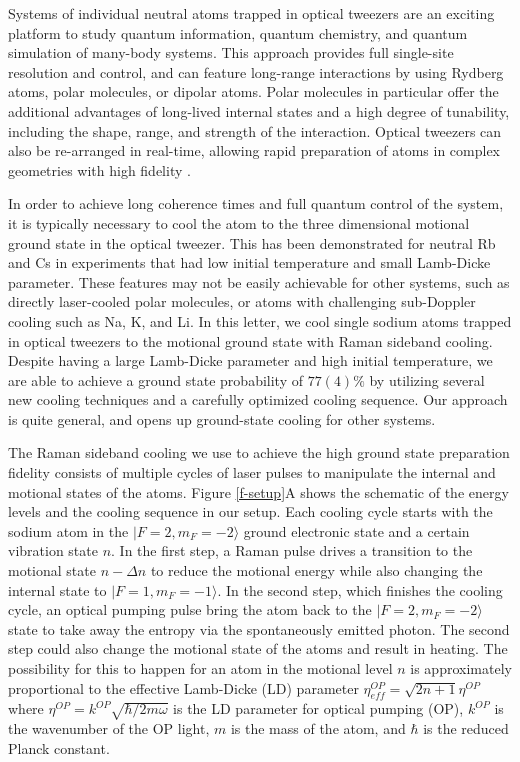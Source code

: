 \documentclass[aps,prl,twocolumn,groupedaddress]{revtex4-1}
\newcommand{\eff}{ef\! f}
\begin{document}
Systems of individual neutral atoms trapped in optical tweezers are an exciting platform to study
quantum information, quantum chemistry, and quantum simulation of many-body systems\cite{Schlosser2001,DeMille2002,Muller2014Rydberg}.
This approach provides full single-site resolution and control,
and can feature long-range interactions by using Rydberg atoms, polar molecules,
or dipolar atoms\cite{Micheli2006,Muller2014Rydberg,Walker2012}.
Polar molecules in particular offer the additional advantages of long-lived internal states
and a high degree of tunability, including the shape, range,
and strength of the interaction\cite{Sortais2007,Beugnon2007,Ni2009}.
Optical tweezers can also be re-arranged in real-time,
allowing rapid preparation of atoms in complex geometries with high fidelity
\cite{Carpentier2013,Weiss2004}.

In order to achieve long coherence times and full quantum control of the system,
it is typically necessary to cool the atom to the
three dimensional motional ground state in the optical tweezer.
This has been demonstrated for neutral Rb\cite{Thompson2013,Kaufman2012}
and Cs\cite{Li2012,Liu2017}
in experiments that had low initial temperature and small Lamb-Dicke parameter.
These features may not be easily achievable for other systems,
such as directly laser-cooled polar molecules\cite{Shuman2010,Chae2017},
or atoms with challenging sub-Doppler cooling such as Na, K, and Li\cite{Shahriar1993a,Colzi2016,Salomon2013,Salomon2015}.
In this letter, we cool single sodium atoms trapped in optical tweezers to
the motional ground state with Raman sideband cooling.
Despite having a large Lamb-Dicke parameter and high initial temperature,
we are able to achieve a ground state probability of $77(4)\%$
by utilizing several new cooling techniques and a carefully optimized cooling sequence.
Our approach is quite general, and opens up ground-state cooling for other systems.

The Raman sideband cooling we use to achieve the high ground state preparation fidelity
consists of multiple cycles of laser pulses to manipulate the internal and
motional states of the atoms.
Figure \ref{f-setup}A shows the schematic of the energy levels and the cooling sequence
in our setup.
Each cooling cycle starts with the sodium atom in the $|F=2, m_F=-2\rangle$
ground electronic state and a certain vibration state $n$.
In the first step, a Raman pulse drives a transition to the motional state $n-\Delta n$
to reduce the motional energy while also changing the internal state to $|F=1, m_F=-1\rangle$.
In the second step, which finishes the cooling cycle,
an optical pumping pulse bring the atom back to the $|F=2, m_F=-2\rangle$ state to take away
the entropy via the spontaneously emitted photon.
The second step could also change the motional state of the atoms and result in heating.
The possibility for this to happen for an atom in the motional level $n$
is approximately proportional to the effective Lamb-Dicke (LD) parameter
$\eta^{OP}_{\eff}=\sqrt{2n+1}\eta^{OP}$ where $\eta^{OP}=k^{OP}\sqrt{\hbar/2m\omega}$
is the LD parameter for optical pumping (OP), $k^{OP}$ is the wavenumber of the OP light, $m$ is the mass of the atom, and $\hbar$ is the reduced Planck constant.
\end{document}
